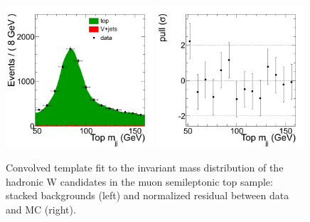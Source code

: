 \begin{figure}[htb] 
  {\centering
    \includegraphics[width=0.49\textwidth]{figs/topwjes/Dibosonlnujj_TopControlSample_muon_Stacked_ConvFit.png}
    \includegraphics[width=0.49\textwidth]{figs/topwjes/Dibosonlnujj_TopControlSample_muon_Pull_ConvFit.png}
    \caption{Convolved template fit to the invariant mass distribution of the hadronic 
      W candidates in the muon semileptonic top sample: stacked backgrounds (left) and normalized residual between data and MC (right).}
    \label{fig:topw:mu_ConvolvedMC}}
\end{figure}
